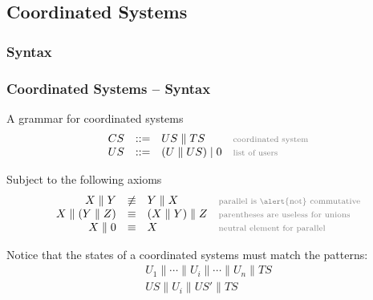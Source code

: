 \documentclass[presentation]{beamer}\mode<presentation>{\usetheme{AMSCesenaPurpleAndGold}}
\begin{document}
\subsection{Coordinated Systems}

\subsubsection{Syntax}

\begin{frame}
\frametitle{Coordinated Systems -- Syntax}

    \begin{block}{A grammar for coordinated systems}
        \[\begin{array}{rcll}
            CS &::=& US \parallel TS & \mathhint{coordinated system}\\
            US &::=& (U \parallel US) \mid 0 & \mathhint{list of users}
        \end{array}\]
    \end{block}
    
    \pause
    
    \begin{block}{Subject to the following axioms}
        \[\begin{array}{rcll}
            X \parallel Y &\not\equiv& Y \parallel X & \mathhint{parallel is \alert{not} commutative} \\
            X \parallel (Y \parallel Z) &\equiv& (X \parallel  Y) \parallel Z & \mathhint{parentheses are useless for unions} \\
            X \parallel 0 &\equiv& X & \mathhint{neutral element for parallel}
        \end{array}\]
    \end{block}
    
    \pause\vfill
    
    \begin{block}{}
	    Notice that the states of a coordinated systems must match the patterns:
	    \[\begin{array}{c}
	        U_1 \parallel \cdots \parallel U_i \parallel \cdots \parallel U_n \parallel TS\\
	        US \parallel U_i \parallel US' \parallel TS
	 	\end{array}\]
    \end{block}
    
\end{frame}
\end{document}

